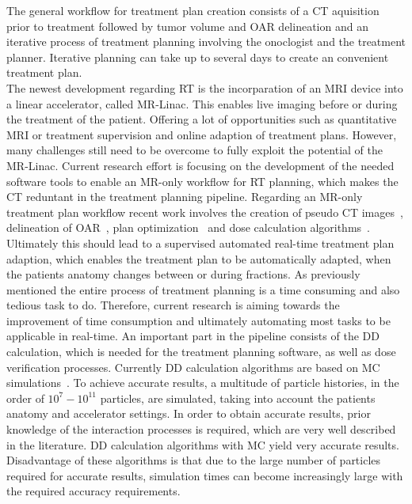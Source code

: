 The general workflow for treatment plan creation consists of a \ac{CT} aquisition prior to treatment followed by tumor volume and \acs{OAR} delineation and an iterative process of treatment planning involving the onoclogist and the treatment planner. 
Iterative planning can take up to several days to create an convenient treatment plan.\\
The newest development regarding \ac{RT} is the incorparation of an \ac{MRI} device into a linear accelerator, called MR-Linac. 
This enables live imaging before or during the treatment of the patient.
Offering a lot of opportunities such as quantitative \acs{MRI} or treatment supervision and online adaption of treatment plans. However, many challenges still need to be overcome to fully exploit the potential of the MR-Linac.
Current research effort is focusing on the development of the needed software tools to enable an MR-only workflow for \acs{RT} planning, which makes the \acs{CT} reduntant in the treatment planning pipeline. 
Regarding an MR-only treatment plan workflow recent work involves the creation of pseudo CT images~\cite{han_mr-based_2017, wolterink_deep_2017, dinkla_mr-only_2018}, delineation of \acs{OAR}~\cite{kazemifar_segmentation_2018, liang_deep-learning-based_2019, shen_medical_2019}, plan optimization~\cite{fan_automatic_2019, liu_deep_2019} and dose calculation algorithms~\cite{javaid_mitigating_2019}.
Ultimately this should lead to a supervised automated real-time treatment plan adaption, which enables the treatment plan to be automatically adapted, when the patients anatomy changes between or during fractions.
As previously mentioned the entire process of treatment planning is a time consuming and also tedious task to do. 
Therefore, current research is aiming towards the improvement of time consumption and ultimately automating most tasks to be applicable in real-time.
An important part in the pipeline consists of the \ac{DD} calculation, which is needed for the treatment planning software, as well as dose verification processes.
Currently \acs{DD} calculation algorithms are based on \ac{MC} simulations~\cite{jabbari_review_2011}. 
To achieve accurate results, a multitude of particle histories, in the order of $10^7 - 10^{11}$ particles, are simulated, taking into account the patients anatomy and accelerator settings.
In order to obtain accurate results, prior knowledge of the interaction processes is required, which are very well described in the literature.
\acs{DD} calculation algorithms with \acs{MC} yield very accurate results. 
Disadvantage of these algorithms is that due to the large number of particles required for accurate results, simulation times can become increasingly large with the required accuracy requirements.

